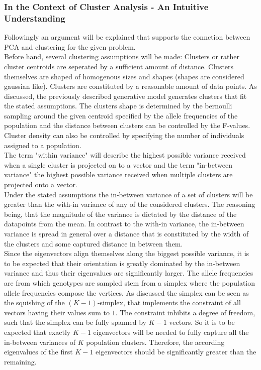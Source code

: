 \documentclass[a4paper, 11pt]{article}
\begin{document}
\subsubsection{In the Context of Cluster Analysis - An Intuitive Understanding}
Followingly an argument will be explained that supports the connction between PCA and clustering for the given problem. \\
Before hand, several clustering assumptions will be made: Clusters or rather cluster centroids are seperated by a sufficient amount of distance. Clusters themselves are shaped of homogenous sizes and shapes (shapes are considered gaussian like). Clusters are constituted by a reasonable amount of data points. As discussed, the previously described generative model generates clusters that fit the stated assumptions. The clusters shape is determined by the bernoulli sampling around the given centroid specified by the allele frequencies of the population and the distance between clusters can be controlled by the F-values. Cluster density can also be controlled by specifying the number of individuals assigned to a population.\\
The term "within variance" will describe the highest possible variance received when a single cluster is projected on to a vector and the term "in-between variance" the highest possible variance received when multiple clusters are projected onto a vector.\\
Under the stated assumptions the in-between variance of a set of clusters will be greater than the with-in variance of any of the considered clusters. The reasoning being, that the magnitude of the variance is dictated by the distance of the datapoints from the mean. In contrast to the with-in variance, the in-between variance is spread in general over a distance that is constituted by the width of the clusters and some captured distance in between them.\\
Since the eigenvectors align themselves along the biggest possible variance, it is to be expected that their orientation is greatly dominated by the in-between variance and thus their eigenvalues are significantly larger. The allele frequencies are from which genotypes are sampled stem from a simplex where the population allele frequencies compose the vertices. As discussed the simplex can be seen as the squishing of the $(K-1)$-simplex, that implements the constraint of all vectors having their values sum to $1$. The constraint inhibits a degree of freedom, such that the simplex can be fully spanned by $K-1$ vectors. So it is to be expected that exactly $K-1$ eigenvectors will be needed to fully capture all the in-between variances of $K$ population clusters. Therefore, the according eigenvalues of the first $K-1$ eigenvectors should be significantly greater than the remaining.\\
\end{document}
